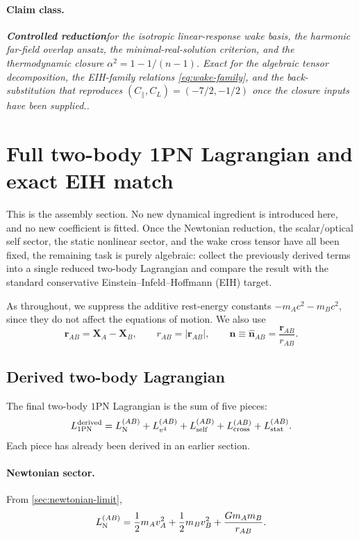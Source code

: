 \documentclass[11pt]{article}
\newcommand{\nvec}{\mathbf n}
\newcommand{\Controlled}{\textbf{Controlled reduction}}
\newcommand{\claimclass}[1]{\paragraph{Claim class.}\emph{#1.}}
\begin{document}
\claimclass{\Controlled for the isotropic linear-response wake basis, the harmonic
far-field overlap ansatz, the minimal-real-solution criterion, and the thermodynamic
closure \(\alpha^2=1-1/(n-1)\). Exact for the algebraic tensor decomposition,
the EIH-family relations \eqref{eq:wake-family}, and the back-substitution that reproduces
\((C_\parallel,C_L)=(-7/2,-1/2)\) once the closure inputs have been supplied.}

\section{Full two-body 1PN Lagrangian and exact EIH match}
\label{sec:full-eih}

This is the assembly section. No new dynamical ingredient is introduced here, and no new
coefficient is fitted. Once the Newtonian reduction, the scalar/optical self sector, the
static nonlinear sector, and the wake cross tensor have all been fixed, the remaining task
is purely algebraic: collect the previously derived terms into a single reduced two-body
Lagrangian and compare the result with the standard conservative Einstein--Infeld--Hoffmann
(EIH) target.

As throughout, we suppress the additive rest-energy constants
\(-m_A c^2-m_B c^2\), since they do not affect the equations of motion. We also use
\begin{equation}
\mathbf r_{AB}=\mathbf X_A-\mathbf X_B,
\qquad
r_{AB}=|\mathbf r_{AB}|,
\qquad
\nvec\equiv \hat{\mathbf n}_{AB}=\frac{\mathbf r_{AB}}{r_{AB}}.
\label{eq:full-eih-separation}
\end{equation}

\subsection{Derived two-body Lagrangian}
\label{sec:derived-2body}

The final two-body \(1\)PN Lagrangian is the sum of five pieces:
\begin{equation}
L_{\rm 1PN}^{\rm derived}
=
L_{\rm N}^{(AB)}
+
L_{v^4}^{(AB)}
+
L_{\rm self}^{(AB)}
+
L_{\rm cross}^{(AB)}
+
L_{\rm stat}^{(AB)}.
\label{eq:assembly-split}
\end{equation}
Each piece has already been derived in an earlier section.

\paragraph{Newtonian sector.}
From \cref{sec:newtonian-limit},
\begin{equation}
L_{\rm N}^{(AB)}
=
\frac12 m_A v_A^2
+
\frac12 m_B v_B^2
+
\frac{Gm_A m_B}{r_{AB}}.
\label{eq:assembly-newtonian}
\end{equation}
\end{document}
